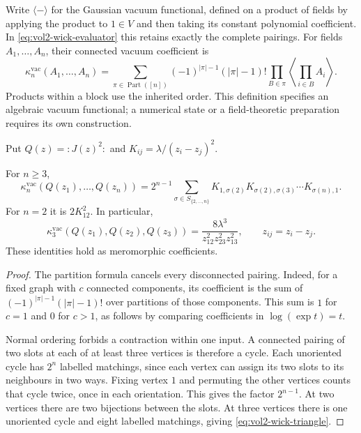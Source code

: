 Write $\langle-\rangle$ for the Gaussian vacuum functional, defined on a product of fields by
applying the product to $1\in V$ and then taking its constant
polynomial coefficient. In \eqref{eq:vol2-wick-evaluator} this retains
exactly the complete pairings. For fields $A_1,\ldots,A_n$, their
connected vacuum coefficient is
\[
 \kappa_n^{\mathrm{vac}}(A_1,\ldots,A_n)
 =\sum_{\pi\in\operatorname{Part}([n])}
   (-1)^{|\pi|-1}(|\pi|-1)!
   \prod_{B\in\pi}\left\langle\prod_{i\in B}A_i\right\rangle.
\]
Products within a block use the inherited order. This definition
specifies an algebraic vacuum functional; a numerical state or a
field-theoretic preparation requires its own construction.

Put $Q(z)={:}J(z)^2{:}$ and $K_{ij}=\lambda/(z_i-z_j)^2$.

\begin{proposition}
\label{prop:vol2-wick-cycles}
For $n\geq3$,
\begin{equation}\label{eq:vol2-wick-cycles}
 \kappa_n^{\mathrm{vac}}(Q(z_1),\ldots,Q(z_n))
 =2^{n-1}\sum_{\sigma\in S_{\{2,\ldots,n\}}}
   K_{1,\sigma(2)}K_{\sigma(2),\sigma(3)}\cdots K_{\sigma(n),1}.
\end{equation}
For $n=2$ it is $2K_{12}^2$. In particular,
\begin{equation}\label{eq:vol2-wick-triangle}
 \kappa_3^{\mathrm{vac}}(Q(z_1),Q(z_2),Q(z_3))
 =\frac{8\lambda^3}{z_{12}^2z_{23}^2z_{13}^2},
 \qquad z_{ij}=z_i-z_j.
\end{equation}
These identities hold as meromorphic coefficients.
\end{proposition}

\begin{proof}
The partition formula cancels every disconnected pairing. Indeed,
for a fixed graph with $c$ connected components, its coefficient is
the sum of $(-1)^{|\pi|-1}(|\pi|-1)!$ over partitions of those
components. This sum is $1$ for $c=1$ and $0$ for $c>1$, as follows
by comparing coefficients in $\log(\exp t)=t$.

Normal ordering forbids a contraction within one input. A connected
pairing of two slots at each of at least three vertices is therefore
a cycle. Each unoriented cycle has $2^n$ labelled matchings, since
each vertex can assign its two slots to its neighbours in two ways.
Fixing vertex $1$ and permuting the other vertices counts that cycle
twice, once in each orientation. This gives the factor $2^{n-1}$.
At two vertices there are two bijections between the slots. At three
vertices there is one unoriented cycle and eight labelled matchings,
giving \eqref{eq:vol2-wick-triangle}.
\end{proof}

